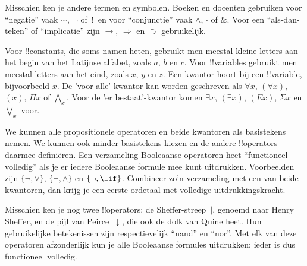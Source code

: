 \documentclass[openany]{memoir}
\begin{document}

\begin{intro}
Misschien ken je andere termen en symbolen. Boeken en docenten
gebruiken voor ``negatie'' vaak $\sim$, $\neg$ of~!\ en voor
``conjunctie'' vaak $\wedge$, $\cdot$ of $\&$. Voor een ``als-dan-teken''
of ``implicatie'' zijn $\rightarrow$, $\Rightarrow$ en $\supset$
gebruikelijk.

Voor !!{constant}s, die soms namen heten, gebruikt men meestal kleine
letters aan het begin van het Latijnse alfabet, zoals $a$, $b$ en $c$.
Voor !!{variable}s gebruikt men meestal letters aan het eind, zoals
$x$, $y$ en $z$. Een kwantor hoort bij een !!{variable}, bijvoorbeeld
$x$. De 'voor alle'-kwantor kan worden geschreven als $\forall x$,
$(\forall x)$, $(x)$, $\Pi x$ of $\bigwedge_x$. Voor de 'er
bestaat'-kwantor komen $\exists x$, $(\exists x)$, $(Ex)$, $\Sigma x$
en $\bigvee_x$ voor.
\end{intro}

\begin{explain}
We kunnen alle propositionele operatoren en beide kwantoren als
basistekens nemen. We kunnen ook minder basistekens kiezen en de andere
!!{operator}s daarmee definiëren. Een verzameling Booleaanse operatoren
heet ``functioneel volledig'' als je er iedere Booleaanse formule mee
kunt uitdrukken. Voorbeelden zijn $\{ \lnot, \lor \}$,
$\{ \lnot, \land \}$ en $\{ \lnot, \lif\}$. Combineer zo'n verzameling
met een van beide kwantoren, dan krijg je een eerste-ordetaal met
volledige uitdrukkingskracht.

Misschien ken je nog twee !!{operator}s: de Sheffer-streep~$|$, genoemd
naar Henry Sheffer, en de pijl van Peirce~$\downarrow$, die ook de dolk
van Quine heet. Hun gebruikelijke betekenissen zijn respectievelijk
``nand'' en ``nor''. Met elk van deze operatoren afzonderlijk kun je
alle Booleaanse formules uitdrukken: ieder is dus functioneel volledig.
\end{explain}
\endgroup

\begingroup
\def\olfilename{OLP-0152}
\def\olfilepath{content/first-order-logic/syntax-and-semantics/}
\hypertarget{unit-OLP-0152}{}
\end{document}
